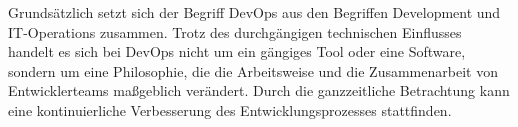 Grundsätzlich setzt sich der Begriff DevOps aus den Begriffen Development und IT-Operations zusammen. Trotz des durchgängigen technischen Einflusses handelt es sich bei DevOps nicht um ein gängiges Tool oder eine Software, sondern um eine Philosophie, die die Arbeitsweise und die Zusammenarbeit von Entwicklerteams maßgeblich verändert. Durch die ganzzeitliche Betrachtung kann eine kontinuierliche Verbesserung des Entwicklungsprozesses stattfinden.